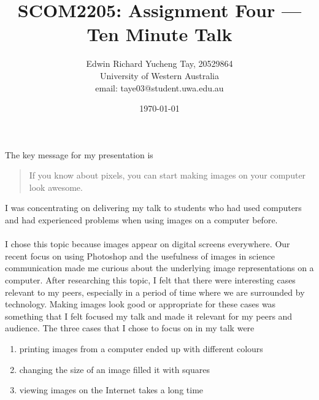 \documentclass[12pt, a4paper, titlepage]{article}
\title{SCOM2205: Assignment Four --- Ten Minute Talk}
\author{Edwin Richard Yucheng Tay, 20529864 \\
University of Western Australia \\
email: taye03@student.uwa.edu.au }
\date{\today}
\begin{document}
\maketitle

The key message for my presentation is

\begin{quote}
	If you know about pixels, you can start making images on your computer look awesome.
\end{quote}

I was concentrating on delivering my talk to students who had used computers and had experienced
problems when using images on a computer before.\\
\\
I chose this topic because images appear on digital screens everywhere.
Our recent focus on using Photoshop and the usefulness of images in science communication made me
curious about the underlying image representations on a computer.
After researching this topic, I felt that there were interesting cases relevant to my peers,
especially in a period of time where we are surrounded by technology.
Making images look good or appropriate for these cases was something that I felt focused my talk and
made it relevant for my peers and audience.
The three cases that I chose to focus on in my talk were

\begin{enumerate}
	\item printing images from a computer ended up with different colours
	\item changing the size of an image filled it with squares
	\item viewing images on the Internet takes a long time
\end{enumerate}

\nocite{*}



\end{document}
